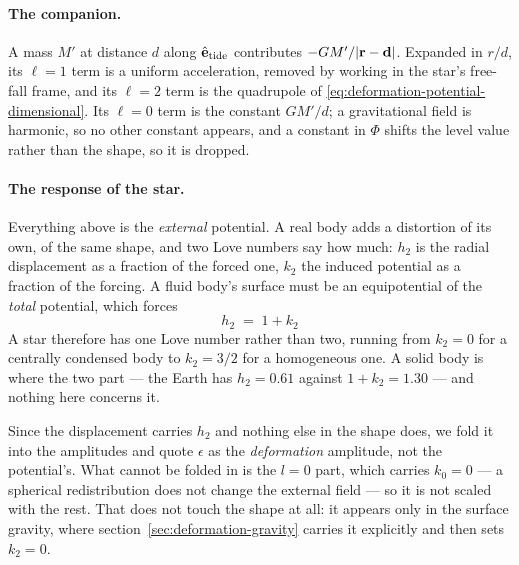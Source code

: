 \paragraph{The companion.}  A mass $M'$ at distance $d$ along $\hat{\mathbf e}_\text{tide}$
contributes $-GM'/|{\mathbf r}-\mathbf d|$.  Expanded in $r/d$, its $\ell = 1$ term is a uniform
acceleration, removed by working in the star's free-fall frame, and its $\ell = 2$ term is the
quadrupole of \eqref{eq:deformation-potential-dimensional}.  Its $\ell = 0$ term is the constant
$GM'/d$; a gravitational field is harmonic, so no other constant appears, and a constant in
$\Phi$ shifts the level value rather than the shape, so it is dropped.

\paragraph{The response of the star.}  Everything above is the \emph{external} potential.  A real
body adds a distortion of its own, of the same shape, and two Love numbers say how much: $h_2$
is the radial displacement as a fraction of the forced one, $k_2$ the induced potential as a
fraction of the forcing.  A fluid body's surface must be an equipotential of the \emph{total}
potential, which forces
\begin{equation}
  h_2 \;=\; 1 + k_2
  \label{eq:love-relation}
\end{equation}
A star therefore has one Love number rather than two, running from $k_2 = 0$ for a centrally
condensed body to $k_2 = 3/2$ for a homogeneous one.  A solid body is where the two part --- the
Earth has $h_2 = 0.61$ against $1 + k_2 = 1.30$ --- and nothing here concerns it.

Since the displacement carries $h_2$ and nothing else in the shape does, we fold it into the
amplitudes and quote $\epsilon$ as the \emph{deformation} amplitude, not the potential's.  What
cannot be folded in is the $l = 0$ part, which carries $k_0 = 0$ --- a spherical redistribution
does not change the external field --- so it is not scaled with the rest.  That does not touch the
shape at all: it appears only in the surface gravity, where
section~\ref{sec:deformation-gravity} carries it explicitly and then sets $k_2 = 0$.

